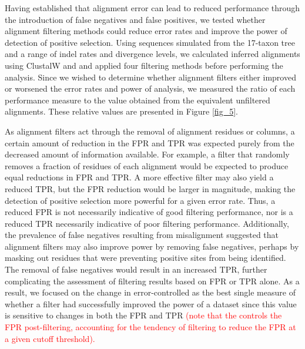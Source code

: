 \documentclass{article}
\begin{document}
Having established that alignment error can lead to reduced \sw
performance through the introduction of false negatives and false
positives, we tested whether alignment filtering methods
could reduce error rates and improve the power of \sw detection of
positive selection. Using sequences simulated from the 17-taxon tree
and a range of indel rates and divergence levels, we calculated
inferred alignments using ClustalW and \prankc and applied four
filtering methods before performing the \sw analysis. Since we wished
to determine whether alignment filters either improved or worsened the
error rates and power of \sw analysis, we measured the ratio of each
performance measure to the value obtained from the equivalent
unfiltered alignments. These relative values are presented in Figure
\ref{fig_5}.

As alignment filters act through the removal of alignment residues or
columns, a certain amount of reduction in the FPR and TPR was expected
purely from the decreased amount of information available. For
example, a filter that randomly removes a fraction of residues of each
alignment would be expected to produce equal reductions in FPR and
TPR. A more effective filter may also yield a reduced TPR, but the FPR
reduction would be larger in magnitude, making the detection of
positive selection more powerful for a given error rate. Thus, a
reduced FPR is not necessarily indicative of good filtering
performance, nor is a reduced TPR necessarily indicative of poor
filtering performance. Additionally, the prevalence of false negatives
resulting from misalignment suggested that alignment filters may also
improve power by removing false negatives, perhaps by masking out
residues that were preventing positive sites from being
identified. The removal of false negatives would result in an
increased TPR, further complicating the assessment of filtering
results based on FPR or TPR alone. As a result, we focused on the
change in error-controlled \tpr{} as the best single measure of
whether a filter had successfully improved the \sw power of a dataset
since this value is sensitive to changes in both the FPR and TPR
\textcolor{red}{(note that the \tpr{} controls the FPR post-filtering,
  accounting for the tendency of filtering to reduce the FPR at a
  given cutoff threshold).}
\end{document}
